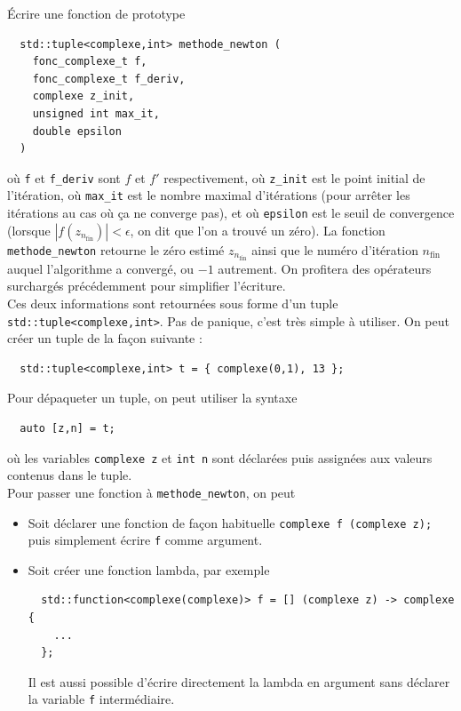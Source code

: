 \documentclass{book}
\newcommand{\inline}[1]{\texttt{#1}}
\begin{document}
Écrire une fonction de prototype
\begin{verbatim}
  std::tuple<complexe,int> methode_newton (
    fonc_complexe_t f,
    fonc_complexe_t f_deriv,
    complexe z_init,
    unsigned int max_it,
    double epsilon
  )
\end{verbatim}
où \inline{f} et \inline{f_deriv} sont $f$ et $f'$ respectivement, où \inline{z_init} est le point initial de l'itération, où \inline{max_it} est le nombre maximal d'itérations (pour arrêter les itérations au cas où ça ne converge pas), et où \inline{epsilon} est le seuil de convergence (lorsque $|f(z_{n_\text{fin}})|<\epsilon$, on dit que l'on a trouvé un zéro). La fonction \inline{methode_newton} retourne le zéro estimé $z_{n_\text{fin}}$ ainsi que le numéro d'itération $n_\text{fin}$ auquel l'algorithme a convergé, ou $-1$ autrement. On profitera des opérateurs surchargés précédemment pour simplifier l'écriture.\\

Ces deux informations sont retournées sous forme d'un tuple \inline{std::tuple<complexe,int>}. Pas de panique, c'est très simple à utiliser. On peut créer un tuple de la façon suivante :
\begin{verbatim}
  std::tuple<complexe,int> t = { complexe(0,1), 13 };
\end{verbatim}
Pour dépaqueter un tuple, on peut utiliser la syntaxe
\begin{verbatim}
  auto [z,n] = t;
\end{verbatim}
où les variables \inline{complexe z} et \inline{int n} sont déclarées puis assignées aux valeurs contenus dans le tuple.\\

Pour passer une fonction à \inline{methode_newton}, on peut
\begin{itemize}
  \item Soit déclarer une fonction de façon habituelle \inline{complexe f (complexe z);} puis simplement écrire \inline{f} comme argument.
  \item Soit créer une fonction lambda, par exemple
\begin{verbatim}
  std::function<complexe(complexe)> f = [] (complexe z) -> complexe {
    ...
  }; 
\end{verbatim}
  Il est aussi possible d'écrire directement la lambda en argument sans déclarer la variable \texttt{f} intermédiaire.
\end{itemize}
\end{document}
